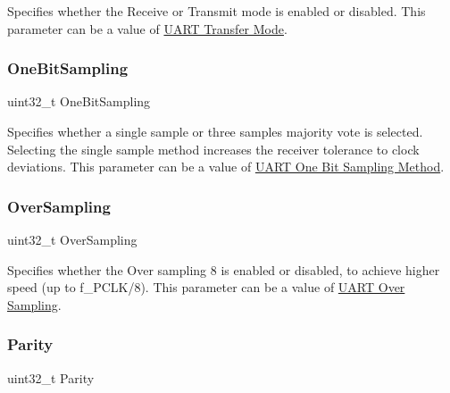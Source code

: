 Specifies whether the Receive or Transmit mode is enabled or disabled. This parameter can be a value of \hyperlink{group___u_a_r_t___mode}{U\+A\+RT Transfer Mode}. \mbox{\label{struct_u_a_r_t___init_type_def_af699e096fa74b5f58c1ee172025981ba}} 
\subsubsection{\texorpdfstring{One\+Bit\+Sampling}{OneBitSampling}}
{\footnotesize\ttfamily uint32\+\_\+t One\+Bit\+Sampling}

Specifies whether a single sample or three samples\textquotesingle{} majority vote is selected. Selecting the single sample method increases the receiver tolerance to clock deviations. This parameter can be a value of \hyperlink{group___u_a_r_t___one_bit___sampling}{U\+A\+RT One Bit Sampling Method}. \mbox{\label{struct_u_a_r_t___init_type_def_a35770b237370fda7fd0fabad22898490}} 
\subsubsection{\texorpdfstring{Over\+Sampling}{OverSampling}}
{\footnotesize\ttfamily uint32\+\_\+t Over\+Sampling}

Specifies whether the Over sampling 8 is enabled or disabled, to achieve higher speed (up to f\+\_\+\+P\+C\+L\+K/8). This parameter can be a value of \hyperlink{group___u_a_r_t___over___sampling}{U\+A\+RT Over Sampling}. \mbox{\label{struct_u_a_r_t___init_type_def_a1d60a99b8f3965f01ab23444b154ba79}} 
\subsubsection{\texorpdfstring{Parity}{Parity}}
{\footnotesize\ttfamily uint32\+\_\+t Parity}

